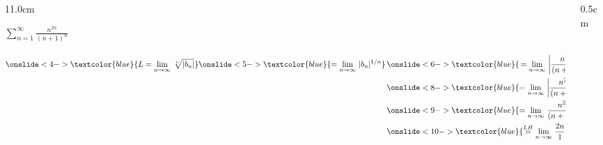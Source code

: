 \begin{frame}
\frametitle{}
\scriptsize

\vspace{0.2cm}

\begin{columns}
\begin{column}{11.0cm}

$\displaystyle{\sum \limits_{n=1}^{\infty} \frac{n^{2n}}{(n+1)^n}}$ \qquad {}

\vspace{0.2cm}


\vspace{0.2cm}

\begin{align*}
	\onslide<4->{\textcolor{blue}{L = \lim \limits_{n \to \infty}\, \sqrt[n]{|b_n|}}} \onslide<5->{\textcolor{blue}{= \lim \limits_{n \to \infty}\, |b_n|^{1/n}}}  &\, \onslide<6->{\textcolor{blue}{\,= \lim \limits_{n \to \infty}\, \left|\frac{n^{2n}}{(n+1)^n}\right|^{1/n}}} \\
	&\,\onslide<8->{\textcolor{blue}{= \lim \limits_{n \to \infty}\, \left|\frac{n^{2n/n}}{(n+1)^{n/n}}\right|}} \\
	&\,\onslide<9->{\textcolor{blue}{= \lim \limits_{n \to \infty}\, \frac{n^{2}}{(n+1)^{1}} \quad ^{\left(\frac{\infty}{\infty}\right)} }} \\
	&\,\onslide<10->{\textcolor{blue}{\overset{LH}{=} \lim \limits_{n \to \infty}\, \frac{2n}{1} = \infty}}
\end{align*}

\vspace{0.2cm}


\vspace{10.5cm}

\end{column}
\begin{column}{0.5cm}
	
\end{column}
\end{columns}
\end{frame}

